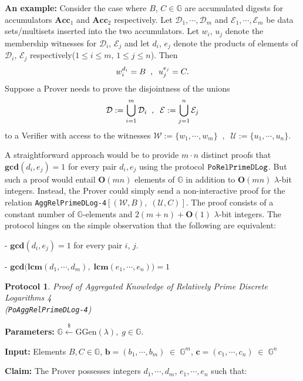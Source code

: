 \documentclass[11pt, lettersize, notitlepage, leqno, footskip=0.6cm]{article}
\newcommand{\bG}{\mathbb{G}}
\newcommand{\Acc}{\mbf{Acc}}
\newcommand{\mc}{\mathcal}
\newcommand{\mb}{\mathbb}
\newcommand{\mbf}{\mathbf}
\newcommand{\mr}{\mathrm}
\newcommand{\lamb}{\lambda}
\newcommand{\bO}{\mbf{O}}
\newcommand{\vs}{\vspace{-0.15cm}}
\newcommand{\noin}{\noindent}
\newcommand{\LCM}{\mbf{lcm}}
\newcommand{\GCD}{\mbf{gcd}}
\newtheorem{Prot}[Thm]{Protocol}
\numberwithin{equation}{section}
\begin{document}
\noin \textbf{An example:} Consider the case where $B$, $C\in\bG$ are accumulated digests for accumulators $\Acc_1$ and $\Acc_2$ respectively. Let $\mc{D}_1,\cdots,\mc{D}_m$ and $\mc{E}_1,\cdots,\mc{E}_m$ be data sets/multisets inserted into the two accumulators. Let $w_i$, $u_j$ denote the membership witnesses for $\mc{D}_i$, $\mc{E}_j$ and let $d_i$, $e_j$ denote the products of elements of $\mc{D}_i$, $\mc{E}_j$ respectively($1\leq i\leq m$, $1\leq j\leq n$). Then \vs $$w_i^{d_i} = B\;\;,\;\; u_j^{e_j} = C. \vs $$ Suppose a Prover needs to prove the disjointness of the unions \vs $$\mc{D} := \bigcup\limits_{i=1}^m \mc{D}_i\;\;,\;\;\mc{E} := \bigcup\limits_{j=1}^n \mc{E}_j \vs $$ to a Verifier with access to the witnesses $\mc{W}:= \{w_1,\cdots,w_m \}\;\;,\;\;\mc{U}:= \{u_1,\cdots,u_n \}.$

A straightforward approach would be to provide $m\cdot n$ distinct proofs that $\GCD(d_i, e_j) = 1$ for every pair $d_i,e_j$ using the protocol $\tt{PoRelPrimeDLog}$. But such a proof would entail $\mbf{O}(mn)$ elements of $\mb{G}$ in addition to $\mbf{O}(mn)$ $\lamb$-bit integers. Instead, the Prover could simply send a non-interactive proof for the relation \verb|AggRelPrimeDLog-4|$[(\mc{W}, B),\;(\mc{U}, C)]$. The proof consists of a constant number of $\mb{G}$-elements and $2(m+n)+\bO(1)$ $\lamb$-bit integers. The protocol hinges on the simple observation that the following are equivalent: \vspace{0.1cm}

\noin - $\GCD(d_i,e_j) = 1$ for every pair $i$, $j$.

\noin - $\GCD\big(\LCM(d_1,\cdots,d_m),\; \LCM(e_1,\cdots, e_n)\big) = 1$

\vspace{0.2cm} 


\begin{Prot} \normalfont \hypertarget{RP4}{\textit{Proof of Aggregated Knowledge of Relatively Prime Discrete Logarithms} 4}\\ (\verb|PoAggRelPrimeDLog-4|)\end{Prot}\vspace{-0.3cm}

\noin \textbf{Parameters:} $\mb{G}\xleftarrow{\$} \mr{GGen}(\lamb), \; g\in \mb{G}$.

\noin \textbf{Input:} Elements $B, C\in \mb{G}$,\;  $\mbf{b} = (b_1,\cdots, b_m)\;\in\;\mb{G}^m$,\;\; $\mbf{c} = (c_1,\cdots, c_n)\;\in\;\mb{G}^n$

\noin \textbf{Claim:} The Prover possesses integers $ d_1,\cdots, d_m$,\; $e_1,\cdots,e_n$ such that:
\end{document}
